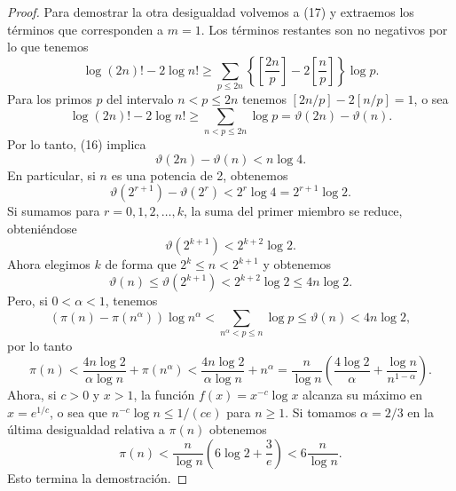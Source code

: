 \documentclass[12pt,a4paper]{book}
\begin{document}
\begin{proof}
        Para demostrar la otra desigualdad volvemos a (17) y extraemos los términos
        que corresponden a $m=1$. Los términos restantes son no negativos por lo que
        tenemos
        \begin{equation*}
            \log(2n)!-2\log n!\geq\sum_{p\leq2n}\left\{\left[\frac{2n}{p}\right]-2\left[\frac{n}{p}\right]\right\}\log p.
        \end{equation*}
        Para los primos $p$ del intervalo $n<p\leq2n$ tenemos $[2n/p]-2[n/p]=1$, o sea
        \begin{equation*}
            \log(2n)!-2\log n!\geq\sum_{n<p\leq2n}\log p=\vartheta(2n)-\vartheta(n).
        \end{equation*}
        Por lo tanto, (16) implica
        \begin{equation*}
            \vartheta(2n)-\vartheta(n)<n\log4.
        \end{equation*}
        En particular, si $n$ es una potencia de 2, obtenemos
        \begin{equation*}
            \vartheta(2^{r+1})-\vartheta(2^{r})<2^{r}\log4=2^{r+1}\log2.
        \end{equation*}
        Si sumamos para $r=0,1,2,\dots,k$, la suma del primer miembro se reduce,
        obteniéndose
        \begin{equation*}
            \vartheta(2^{k+1})<2^{k+2}\log2.
        \end{equation*}
        Ahora elegimos $k$ de forma que $2^{k}\leq n<2^{k+1}$ y obtenemos
        \begin{equation*}
            \vartheta(n)\leq\vartheta(2^{k+1})<2^{k+2}\log2\leq4n\log2.
        \end{equation*}
        Pero, si $0<\alpha<1$, tenemos
        \begin{equation*}
            (\pi(n)-\pi(n^{\alpha}))\log n^{\alpha}<\sum_{n^{\alpha}<p\leq n}\log p\leq\vartheta(n)<4n\log2,
        \end{equation*}
        por lo tanto
        \begin{equation*}
            \pi(n)<\frac{4n\log2}{\alpha\log n}+\pi(n^{\alpha})<\frac{4n\log2}{\alpha\log n}+n^{\alpha}
            =\frac{n}{\log n}\left(\frac{4\log2}{\alpha}+\frac{\log n}{n^{1-\alpha}}\right).
        \end{equation*}
        Ahora, si $c>0$ y $x>1$, la función $f(x)=x^{-c}\log x$ alcanza su máximo en
        $x=e^{1/c}$, o sea que $n^{-c}\log n\leq1/(ce)$ para $n\geq1$. Si tomamos
        $\alpha=2/3$ en la última desigualdad relativa a $\pi(n)$ obtenemos
        \begin{equation*}
            \pi(n)<\frac{n}{\log n}\left(6\log2+\frac{3}{e}\right)<6\frac{n}{\log n}.
        \end{equation*}
        Esto termina la demostración.
    \end{proof}
\end{document}
